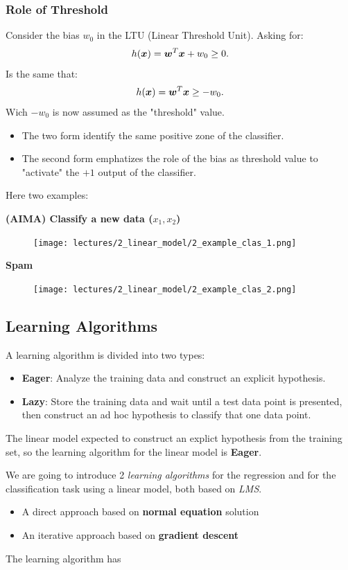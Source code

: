 \documentclass[../main.tex]{subfiles}
\begin{document}
\subsubsection{Role of Threshold}%
Consider the bias $w_0$ in the LTU (Linear Threshold Unit). Asking for:
\[
    h(\boldsymbol{x}) = \boldsymbol{w}^T\boldsymbol{x} + w_0 \ge 0
.\] 
Is the same that:
\[
    h(\boldsymbol{x}) = \boldsymbol{w}^T\boldsymbol{x} \ge -w_0
.\] 
Wich $-w_0$ is now assumed as the "threshold" value.
\begin{itemize}
    \item The two form identify the same positive zone of the classifier.
    \item The second form emphatizes the role of the bias as threshold value to "activate" the $+1$ output of the classifier.
\end{itemize}

Here two examples:

\textbf{(AIMA) Classify a new data ($x_1,x_2$)}
\begin{figure}[H]
    \centering
    \texttt{[image: lectures/2\_linear\_model/2\_example\_clas\_1.png]}
\end{figure}

\textbf{Spam}
\begin{figure}[H]
    \centering
    \texttt{[image: lectures/2\_linear\_model/2\_example\_clas\_2.png]}
\end{figure}

\subsection{Learning Algorithms}
A learning algorithm is divided into two types:
\begin{itemize}
    \item \textbf{Eager}: Analyze the training data and construct an explicit hypothesis.
    \item \textbf{Lazy}: Store the training data and wait until a test data point is presented, then construct an ad hoc hypothesis to classify that one data point.
\end{itemize}
The linear model expected to construct an explict hypothesis from the training set, so the learning algorithm for the linear model is \textbf{Eager}.

We are going to introduce 2 \emph{learning algorithms} for the regression and for the classification task using a linear model, both based on \emph{LMS}.
\begin{itemize}
    \item A direct approach based on \textbf{normal equation} solution
    \item An iterative approach based on \textbf{gradient descent}
\end{itemize}
The learning algorithm has 
\end{document}
